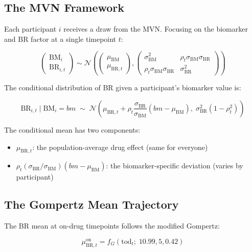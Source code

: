 \documentclass[11pt]{article}
\begin{document}
\subsection{The MVN Framework}

Each participant $i$ receives a draw from the MVN. Focusing on
the biomarker and BR factor at a single timepoint $t$:

\[
\begin{pmatrix} \text{BM}_i \\ \text{BR}_{i,t} \end{pmatrix}
\sim \mathcal{N}\!\left(
\begin{pmatrix} \mu_{\text{BM}} \\ \mu_{\text{BR},t}
\end{pmatrix},
\begin{pmatrix}
\sigma_{\text{BM}}^2 &
  \rho_t \sigma_{\text{BM}} \sigma_{\text{BR}} \\
\rho_t \sigma_{\text{BM}} \sigma_{\text{BR}} &
  \sigma_{\text{BR}}^2
\end{pmatrix}
\right)
\]

The conditional distribution of BR given a participant's
biomarker value is:

\begin{equation}
\text{BR}_{i,t} \mid \text{BM}_i = bm \;\sim\;
\mathcal{N}\!\left(
  \mu_{\text{BR},t} +
  \rho_t \frac{\sigma_{\text{BR}}}{\sigma_{\text{BM}}}
  (bm - \mu_{\text{BM}}),\;
  \sigma_{\text{BR}}^2 (1 - \rho_t^2)
\right)
\label{eq:conditional}
\end{equation}

The conditional mean has two components:

\begin{itemize}
\item $\mu_{\text{BR},t}$: the population-average drug effect
  (same for everyone)
\item $\rho_t (\sigma_{\text{BR}} / \sigma_{\text{BM}})
  (bm - \mu_{\text{BM}})$: the biomarker-specific deviation
  (varies by participant)
\end{itemize}

\subsection{The Gompertz Mean Trajectory}

The BR mean at on-drug timepoints follows the modified Gompertz:

\[
\mu_{\text{BR},t}^{\text{on}} =
  f_G(\text{tod}_t;\; 10.99, 5, 0.42)
\]
\end{document}
